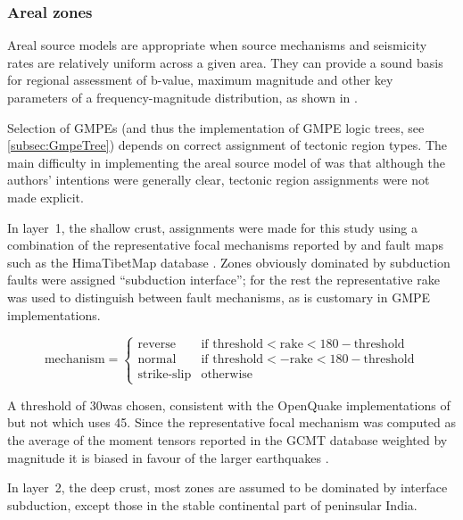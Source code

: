 \documentclass{article}
\begin{document}
\subsubsection{Areal zones}
\label{subsubsec:Areal}

Areal source models are appropriate when source mechanisms and seismicity rates are relatively uniform across a given area.
They can provide a sound basis for regional assessment of b-value, maximum magnitude and other key parameters of a frequency-magnitude distribution, as shown in \cite{thingbaijam2011seismogenic}.

Selection of GMPEs (and thus the implementation of GMPE logic trees, see \autoref{subsec:GmpeTree}) depends on correct assignment of tectonic region types.
The main difficulty in implementing the areal source model of \cite{nath2012probabilistic} was that although the authors' intentions were generally clear, tectonic region assignments were not made explicit.

In layer~1, the shallow crust, assignments were made for this study using a combination of the representative focal mechanisms reported by \cite{nath2012probabilistic} and fault maps such as the HimaTibetMap database \citep{styron2010database}.
Zones obviously dominated by subduction faults were assigned ``subduction interface''; for the rest the representative rake was used to distinguish between fault mechanisms, as is customary in GMPE implementations.

$$
\text{mechanism} = 
\begin{cases}
\text{reverse} & 
\text{if threshold} < \text{rake} < 180 - \text{threshold} \\
\text{normal} & 
\text{if threshold} < -\text{rake} < 180 - \text{threshold} \\
\text{strike-slip} & 
\text{otherwise}
\end{cases}
$$

A threshold of 30\degree\space was chosen, consistent with the OpenQuake implementations of \cite{boore2008ground, campbell2008nga, sharma2009ground} but not \cite{zhao2006attenuation} which uses 45\degree.
Since the representative focal mechanism was computed as the average of the moment tensors reported in the GCMT database weighted by magnitude it is biased in favour of the larger earthquakes \citep{thingbaijam2011seismogenic}.

In layer~2, the deep crust, most zones are assumed to be dominated by interface subduction, except those in the stable continental part of peninsular India.
\end{document}
